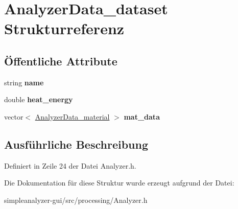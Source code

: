 \hypertarget{structAnalyzerData__dataset}{\section{Analyzer\-Data\-\_\-dataset Strukturreferenz}
\label{structAnalyzerData__dataset}
}
\subsection*{Öffentliche Attribute}
\begin{DoxyCompactItemize}
\item 
\hypertarget{structAnalyzerData__dataset_aec7f1c57906c7e5bc821f127d803afe3}{string {\bfseries name}}\label{structAnalyzerData__dataset_aec7f1c57906c7e5bc821f127d803afe3}

\item 
\hypertarget{structAnalyzerData__dataset_a4ef750609b9311be44bf60a3f5b00321}{double {\bfseries heat\-\_\-energy}}\label{structAnalyzerData__dataset_a4ef750609b9311be44bf60a3f5b00321}

\item 
\hypertarget{structAnalyzerData__dataset_a56f26f1202857c8ade9e486da0ee4372}{vector$<$ \hyperlink{structAnalyzerData__material}{Analyzer\-Data\-\_\-material} $>$ {\bfseries mat\-\_\-data}}\label{structAnalyzerData__dataset_a56f26f1202857c8ade9e486da0ee4372}

\end{DoxyCompactItemize}


\subsection{Ausführliche Beschreibung}


Definiert in Zeile 24 der Datei Analyzer.\-h.



Die Dokumentation für diese Struktur wurde erzeugt aufgrund der Datei\-:\begin{DoxyCompactItemize}
\item 
simpleanalyzer-\/gui/src/processing/Analyzer.\-h\end{DoxyCompactItemize}
